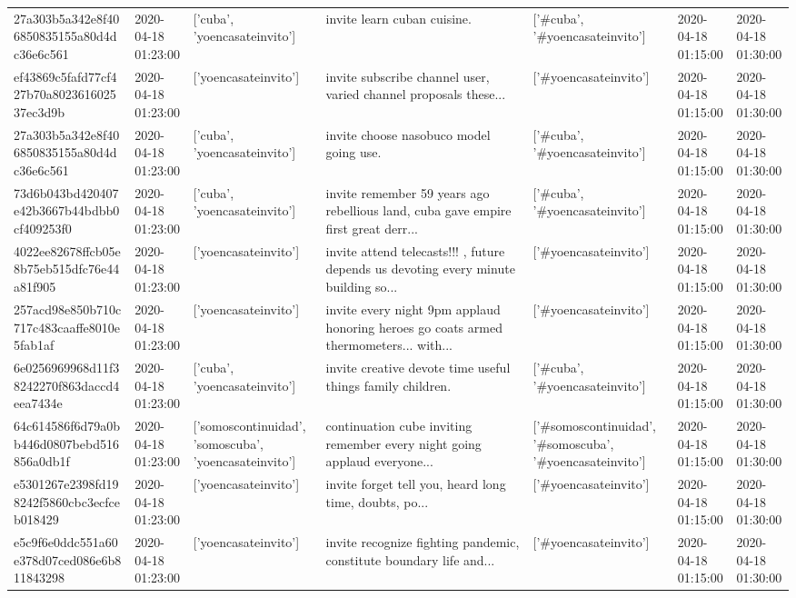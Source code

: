 \begin{tabular}{lllllll}
27a303b5a342e8f406850835155a80d4dc36e6c561 & 2020-04-18 01:23:00 & ['cuba', 'yoencasateinvito'] & invite learn cuban cuisine. & ['#cuba', '#yoencasateinvito'] & 2020-04-18 01:15:00 & 2020-04-18 01:30:00 \\
ef43869c5fafd77cf427b70a802361602537ec3d9b & 2020-04-18 01:23:00 & ['yoencasateinvito'] & invite subscribe channel user, varied channel proposals these... & ['#yoencasateinvito'] & 2020-04-18 01:15:00 & 2020-04-18 01:30:00 \\
27a303b5a342e8f406850835155a80d4dc36e6c561 & 2020-04-18 01:23:00 & ['cuba', 'yoencasateinvito'] & invite choose nasobuco model going use. & ['#cuba', '#yoencasateinvito'] & 2020-04-18 01:15:00 & 2020-04-18 01:30:00 \\
73d6b043bd420407e42b3667b44bdbb0cf409253f0 & 2020-04-18 01:23:00 & ['cuba', 'yoencasateinvito'] & invite remember 59 years ago rebellious land, cuba gave empire first great derr... & ['#cuba', '#yoencasateinvito'] & 2020-04-18 01:15:00 & 2020-04-18 01:30:00 \\
4022ee82678ffcb05e8b75eb515dfc76e44a81f905 & 2020-04-18 01:23:00 & ['yoencasateinvito'] & invite attend telecasts!!! , future depends us devoting every minute building so... & ['#yoencasateinvito'] & 2020-04-18 01:15:00 & 2020-04-18 01:30:00 \\
257acd98e850b710c717c483caaffe8010e5fab1af & 2020-04-18 01:23:00 & ['yoencasateinvito'] & invite every night 9pm applaud honoring heroes go coats armed thermometers... with... & ['#yoencasateinvito'] & 2020-04-18 01:15:00 & 2020-04-18 01:30:00 \\
6e0256969968d11f38242270f863daccd4eea7434e & 2020-04-18 01:23:00 & ['cuba', 'yoencasateinvito'] & invite creative devote time useful things family children. & ['#cuba', '#yoencasateinvito'] & 2020-04-18 01:15:00 & 2020-04-18 01:30:00 \\
64c614586f6d79a0bb446d0807bebd516856a0db1f & 2020-04-18 01:23:00 & ['somoscontinuidad', 'somoscuba', 'yoencasateinvito'] & continuation cube inviting remember every night going applaud everyone... & ['#somoscontinuidad', '#somoscuba', '#yoencasateinvito'] & 2020-04-18 01:15:00 & 2020-04-18 01:30:00 \\
e5301267e2398fd198242f5860cbc3ecfceb018429 & 2020-04-18 01:23:00 & ['yoencasateinvito'] & invite forget tell you, heard long time, doubts, po... & ['#yoencasateinvito'] & 2020-04-18 01:15:00 & 2020-04-18 01:30:00 \\
e5c9f6e0ddc551a60e378d07ced086e6b811843298 & 2020-04-18 01:23:00 & ['yoencasateinvito'] & invite recognize fighting pandemic, constitute boundary life and... & ['#yoencasateinvito'] & 2020-04-18 01:15:00 & 2020-04-18 01:30:00 \\

\end{tabular}
